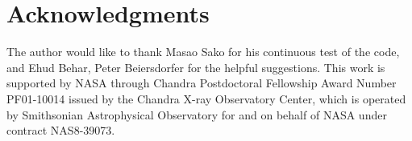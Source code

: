 \documentclass{elsart}
\begin{document}
\section*{Acknowledgments}
The author would like to thank Masao Sako for his continuous test of the code,
and Ehud Behar, Peter Beiersdorfer for the helpful suggestions. 
This work is supported by
NASA through Chandra Postdoctoral Fellowship Award Number PF01-10014 issued by
the Chandra X-ray Observatory Center, which is operated by Smithsonian
Astrophysical Observatory for and on behalf of NASA under contract NAS8-39073.



\end{document}
